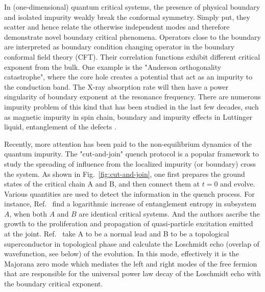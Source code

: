 

In (one-dimensional) quantum critical systems, the presence of physical boundary and isolated impurity weakly break the conformal symmetry. Simply put, they scatter and hence relate the otherwise independent modes and therefore demonstrate novel boundary critical phenomena\cite{cardy_boundary_2004}. Operators close to the boundary are interpreted as boundary condition changing operator\cite{oshikawa_boundary_1997,affleck_boundary_1997} in the boundary conformal field theory (CFT). Their correlation functions exhibit different critical exponent from the bulk\cite{cardy_conformal_1984}. One example is the "Anderson orthogonality catastrophe", where the core hole creates a potential that act as an impurity to the conduction band. The X-ray absorption rate will then have a power singularity of boundary exponent\cite{affleck_boundary_1997} at the resonance frequency. There are numerous impurity problem of this kind that has been studied in the last few decades, such as magnetic impurity in spin chain\cite{eggert_magnetic_1992}, boundary and impurity effects in Luttinger liquid\cite{fabrizio_interacting_1995}, entanglement of the defects\cite{peschel_entanglement_2005, igloi_entanglement_2009,calabrese_entanglement_2012} \etc.

Recently, more attention has been paid to the non-equilibrium dynamics of the quantum impurity. The "cut-and-join" quench protocol is a popular framework to study the spreading of influence from the localized impurity (or boundary) cross the system. As shown in Fig.~\ref{fig:cut-and-join}, one first prepares the ground states of the critical chain A and B, and then connect them at $t = 0$ and evolve. Various quantities are used to detect the information in the quench process. For instance, Ref.~ find a logarithmic increase of entanglement entropy in subsystem $A$, when both $A$ and $B$ are identical critical systems. And the authors ascribe the growth to the proliferation and propagation of quasi-particle excitation emitted at the joint. Ref.~ take A to be a normal lead and B to be a topological superconductor in topological phase and calculate the Loschmidt echo (overlap of wavefunction, see below) of the evolution. In this mode, effectively it is the Majorana zero mode which mediates the left and right modes of the free fermion that are responsible for the universal power law decay of the Loschmidt echo with the boundary critical exponent. 

